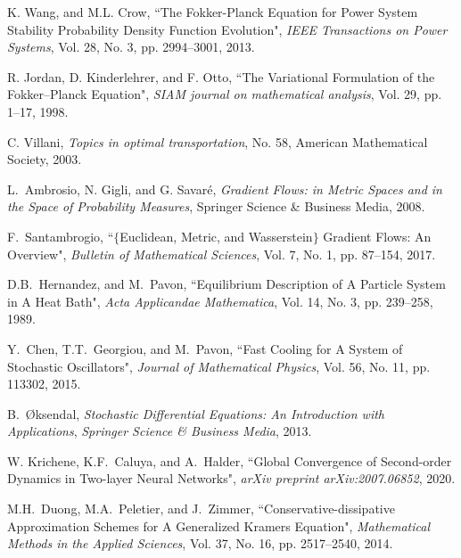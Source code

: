 \documentclass[10pt,twocolumn]{IEEEtran}
\begin{document}
\begin{thebibliography}{99}

K. Wang, and M.L. Crow, ``The Fokker-Planck Equation for Power System Stability Probability Density Function Evolution", \emph{IEEE Transactions on Power Systems}, Vol. 28, No. 3, pp. 2994--3001, 2013.


R. Jordan, D. Kinderlehrer, and F. Otto, ``The Variational Formulation of the Fokker--Planck Equation", \emph{SIAM journal on mathematical analysis}, Vol. 29, pp. 1--17, 1998.

C. Villani, \emph{Topics in optimal transportation}, No. 58, American Mathematical Society, 2003.

L.~Ambrosio, N. Gigli, and G. Savar{\'e}, \emph{Gradient Flows: in Metric Spaces and in the Space of Probability Measures}, Springer Science \& Business Media, 2008.

F.~Santambrogio, ``$\{$Euclidean, Metric, and Wasserstein$\}$ Gradient Flows: An Overview", \emph{Bulletin of Mathematical Sciences}, Vol. 7, No. 1, pp. 87--154, 2017. 


D.B.~Hernandez, and M.~Pavon, ``Equilibrium Description of A Particle System in A Heat Bath", \emph{Acta Applicandae Mathematica}, Vol. 14, No. 3, pp. 239--258, 1989.

Y.~Chen, T.T.~Georgiou, and M.~Pavon, ``Fast Cooling for A System of Stochastic Oscillators", \emph{Journal of Mathematical Physics}, Vol. 56, No. 11, pp. 113302, 2015.


B.~\O{}ksendal, \emph{Stochastic Differential Equations: An Introduction with Applications}, \emph{Springer Science \& Business Media}, 2013.


W. Krichene, K.F.~Caluya, and A.~Halder, ``Global Convergence of Second-order Dynamics in Two-layer Neural Networks", \emph{arXiv preprint arXiv:2007.06852}, 2020.


M.H.~Duong, M.A.~Peletier, and J.~Zimmer, ``Conservative-dissipative Approximation Schemes for A Generalized Kramers Equation", \emph{Mathematical Methods in the Applied Sciences}, Vol. 37, No. 16, pp. 2517--2540, 2014.


\end{thebibliography}
\end{document}
